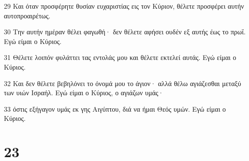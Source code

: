 \par 29 Και όταν προσφέρητε θυσίαν ευχαριστίας εις τον Κύριον, θέλετε προσφέρει αυτήν αυτοπροαιρέτως.
\par 30 Την αυτήν ημέραν θέλει φαγωθή· δεν θέλετε αφήσει ουδέν εξ αυτής έως το πρωΐ. Εγώ είμαι ο Κύριος.
\par 31 Θέλετε λοιπόν φυλάττει τας εντολάς μου και θέλετε εκτελεί αυτάς. Εγώ είμαι ο Κύριος.
\par 32 Και δεν θέλετε βεβηλόνει το όνομά μου το άγιον· αλλά θέλω αγιάζεσθαι μεταξύ των υιών Ισραήλ. Εγώ είμαι ο Κύριος, ο αγιάζων υμάς·
\par 33 όστις εξήγαγον υμάς εκ γης Αιγύπτου, διά να ήμαι Θεός υμών. Εγώ είμαι ο Κύριος.

\chapter{23}

